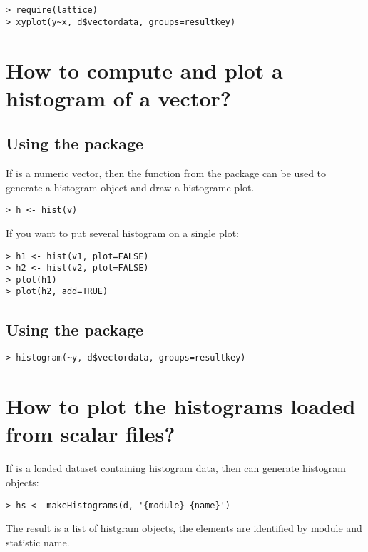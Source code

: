 \begin{verbatim}
> require(lattice)
> xyplot(y~x, d$vectordata, groups=resultkey)
\end{verbatim}

\section{How to compute and plot a histogram of a vector?}

\subsection{Using the  package}

If  is a numeric vector, then the  function from the  package
can be used to generate a histogram object and draw a histograme plot.

\begin{verbatim}
> h <- hist(v)
\end{verbatim}

If you want to put several histogram on a single plot:

\begin{verbatim}
> h1 <- hist(v1, plot=FALSE)
> h2 <- hist(v2, plot=FALSE)
> plot(h1)
> plot(h2, add=TRUE)
\end{verbatim}

\subsection{Using the  package}

\begin{verbatim}
> histogram(~y, d$vectordata, groups=resultkey)
\end{verbatim}

\section{How to plot the histograms loaded from scalar files?}

If  is a loaded dataset containing histogram data, then  can generate
histogram objects:

\begin{verbatim}
> hs <- makeHistograms(d, '{module} {name}') 
\end{verbatim}

The result is a list of histgram objects, the elements are identified by module and statistic name.

